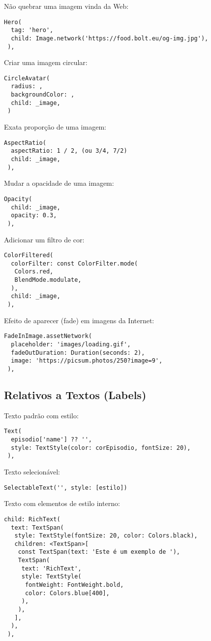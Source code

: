 \documentclass[11pt]{scrartcl}
\begin{document}
Não quebrar uma imagem vinda da Web:
\begin{lstlisting}[]
 Hero(
  tag: 'hero', 
  child: Image.network('https://food.bolt.eu/og-img.jpg'),
 ),
\end{lstlisting}

Criar uma imagem circular:
\begin{lstlisting}[]
 CircleAvatar(
  radius: ,
  backgroundColor: ,
  child: _image,
 )
\end{lstlisting}

Exata proporção de uma imagem:
\begin{lstlisting}[]
 AspectRatio(
  aspectRatio: 1 / 2, (ou 3/4, 7/2)
  child: _image,
 ),
\end{lstlisting}

Mudar a opacidade de uma imagem:
\begin{lstlisting}[]
 Opacity(
  child: _image,
  opacity: 0.3,
 ),	
\end{lstlisting}

Adicionar um filtro de cor:
\begin{lstlisting}[]
 ColorFiltered(
  colorFilter: const ColorFilter.mode(
   Colors.red,
   BlendMode.modulate,
  ),
  child: _image,
 ),	
\end{lstlisting}

Efeito de aparecer (fade) em imagens da Internet:
\begin{lstlisting}[]
 FadeInImage.assetNetwork(
  placeholder: 'images/loading.gif',
  fadeOutDuration: Duration(seconds: 2),
  image: 'https://picsum.photos/250?image=9',
 ),	
\end{lstlisting}

\subsection{Relativos a Textos (Labels)}
Texto padrão com estilo:
\begin{lstlisting}[]
 Text(
  episodio['name'] ?? '',
  style: TextStyle(color: corEpisodio, fontSize: 20),
 ),
\end{lstlisting}

Texto selecionável:
\begin{lstlisting}[]
 SelectableText('', style: [estilo])
\end{lstlisting}

Texto com elementos de estilo interno:
\begin{lstlisting}[]
 child: RichText(
  text: TextSpan(
   style: TextStyle(fontSize: 20, color: Colors.black),
   children: <TextSpan>[
    const TextSpan(text: 'Este é um exemplo de '),
    TextSpan(
     text: 'RichText',
     style: TextStyle(
      fontWeight: FontWeight.bold,
      color: Colors.blue[400],
     ),
    ),
   ],
  ),
 ),
\end{lstlisting}
\end{document}
